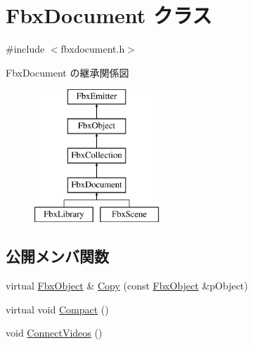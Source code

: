 \hypertarget{class_fbx_document}{}\section{Fbx\+Document クラス}
\label{class_fbx_document}


{\ttfamily \#include $<$fbxdocument.\+h$>$}

Fbx\+Document の継承関係図\begin{figure}[H]
\begin{center}
\leavevmode
\includegraphics[height=5.000000cm]{class_fbx_document}
\end{center}
\end{figure}
\subsection*{公開メンバ関数}
\begin{DoxyCompactItemize}
\item 
virtual \hyperlink{class_fbx_object}{Fbx\+Object} \& \hyperlink{class_fbx_document_a6a345cc64e4ee39a6fd719b56d50dfac}{Copy} (const \hyperlink{class_fbx_object}{Fbx\+Object} \&p\+Object)
\item 
virtual void \hyperlink{class_fbx_document_a62a41699423c0431a1e0969e9dea176d}{Compact} ()
\item 
void \hyperlink{class_fbx_document_a1d4dc5bd8518bd2e37f1b13aa950350f}{Connect\+Videos} ()
\end{DoxyCompactItemize}
